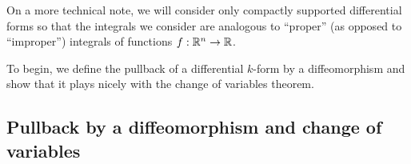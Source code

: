 

On a more technical note, we will consider only compactly supported differential forms so that the integrals we consider are analogous to ``proper'' (as opposed to ``improper'') integrals of functions $f:\mathbb{R}^n \rightarrow \mathbb{R}$. 


To begin, we define the pullback of a differential $k$-form by a diffeomorphism and show that it plays nicely with the change of variables theorem.

\subsection*{Pullback by a diffeomorphism and change of variables}

